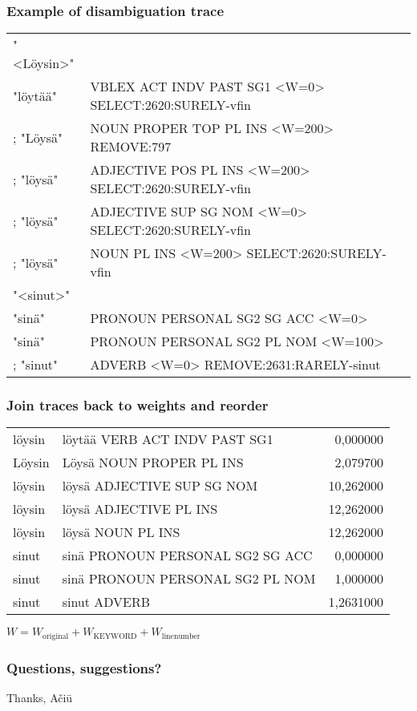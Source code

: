 \documentclass{beamer}
\begin{document}
\begin{frame}
    \frametitle{Example of disambiguation trace}
    \small
    \begin{tabular}{ll}
        "<Löysin>" & \\
        "löytää" & VBLEX ACT INDV PAST SG1 <W=0> SELECT:2620:SURELY-vfin \\
        ;	"Löysä" & NOUN PROPER TOP PL INS <W=200> REMOVE:797 \\
        ;	"löysä" & ADJECTIVE POS PL INS <W=200> SELECT:2620:SURELY-vfin \\
        ;	"löysä" & ADJECTIVE SUP SG NOM <W=0> SELECT:2620:SURELY-vfin \\
        ;	"löysä" & NOUN PL INS <W=200> SELECT:2620:SURELY-vfin \\
        "<sinut>" & \\
"sinä" & PRONOUN PERSONAL SG2 SG ACC <W=0> \\
        "sinä" & PRONOUN PERSONAL SG2 PL NOM <W=100> \\
        ;	"sinut" & ADVERB <W=0> REMOVE:2631:RARELY-sinut \\
    \end{tabular}
\end{frame}

\begin{frame}
    \frametitle{Join traces back to weights and reorder }
    \begin{tabular}{llr}
löysin & löytää VERB ACT INDV PAST SG1 & 0,000000 \\
Löysin & Löysä NOUN PROPER PL INS & 2,079700 \\
löysin & löysä ADJECTIVE SUP SG NOM & 10,262000 \\
löysin & löysä ADJECTIVE PL INS & 12,262000 \\
löysin & löysä NOUN PL INS & 12,262000 \\

sinut & sinä PRONOUN PERSONAL SG2 SG ACC & 0,000000 \\
sinut & sinä PRONOUN PERSONAL SG2 PL NOM & 1,000000 \\
sinut & sinut ADVERB & 1,2631000 \\
    \end{tabular}
    $W=W_{\mathrm{original}} + W_{\mathrm{KEYWORD}} + W_{\mathrm{line number}}$
\end{frame}

\begin{frame}
    \frametitle{Questions, suggestions?}
    Thanks, Ačiū
\end{frame}
\end{document}
